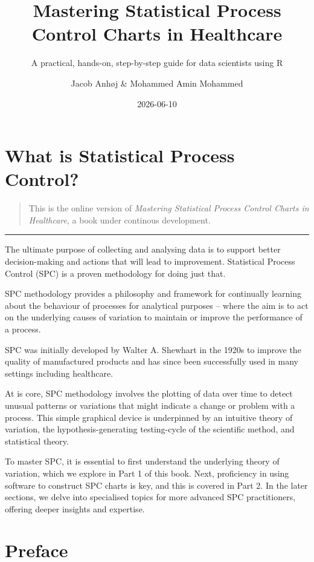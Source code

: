 \documentclass[
]{book}
\title{Mastering Statistical Process Control Charts in Healthcare}
\subtitle{A practical, hands-on, step-by-step guide for data scientists
using R}
\author{Jacob Anhøj \& Mohammed Amin Mohammed}
\date{2026-06-10}
\begin{document}
\frontmatter
\maketitle

\mainmatter
\chapter*{What is Statistical Process Control?}\label{what}

\begin{quote}
This is the online version of \emph{Mastering Statistical Process
Control Charts in Healthcare}, a book under continous development.
\end{quote}

\begin{center}\rule{0.5\linewidth}{0.5pt}\end{center}

The ultimate purpose of collecting and analysing data is to support
better decision-making and actions that will lead to improvement.
Statistical Process Control (SPC) is a proven methodology for doing just
that.

SPC methodology provides a philosophy and framework for continually
learning about the behaviour of processes for analytical purposes --
where the aim is to act on the underlying causes of variation to
maintain or improve the performance of a process.

SPC was initially developed by Walter A. Shewhart in the 1920s to
improve the quality of manufactured products and has since been
successfully used in many settings including healthcare.

At is core, SPC methodology involves the plotting of data over time to
detect unusual patterns or variations that might indicate a change or
problem with a process. This simple graphical device is underpinned by
an intuitive theory of variation, the hypothesis-generating
testing-cycle of the scientific method, and statistical theory.

To master SPC, it is essential to first understand the underlying theory
of variation, which we explore in Part 1 of this book. Next, proficiency
in using software to construct SPC charts is key, and this is covered in
Part 2. In the later sections, we delve into specialised topics for more
advanced SPC practitioners, offering deeper insights and expertise.

\chapter*{Preface}\label{preface}
\end{document}
